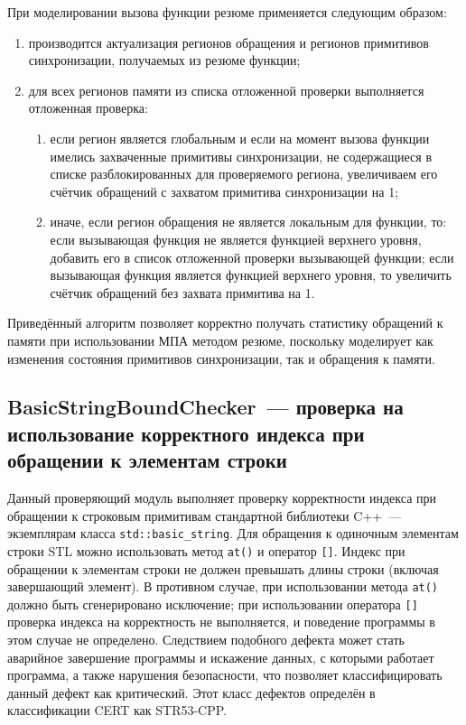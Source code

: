 При моделировании вызова функции резюме применяется следующим образом:

\begin{enumerate}
 \item производится актуализация регионов обращения и регионов примитивов синхронизации, получаемых из резюме функции;
 \item для всех регионов памяти из списка отложенной проверки выполняется отложенная проверка:
 \begin{enumerate}
 \item если регион является глобальным и если на момент вызова функции имелись захваченные примитивы синхронизации, не содержащиеся в списке разблокированных для проверяемого региона, увеличиваем его счётчик обращений с захватом примитива синхронизации на 1;
 \item иначе, если регион обращения не является локальным для функции, то: если вызывающая функция не является функцией верхнего уровня, добавить его в список отложенной проверки вызывающей функции; если вызывающая функция является функцией верхнего уровня, то увеличить счётчик обращений без захвата примитива на 1.
 \end{enumerate}
\end{enumerate}

Приведённый алгоритм позволяет корректно получать статистику обращений к памяти при использовании МПА методом резюме, поскольку моделирует как изменения состояния примитивов синхронизации, так и обращения к памяти.


\subsection{BasicStringBoundChecker~--- проверка на использование корректного индекса при обращении к элементам строки} \label{sect:basic_string}

Данный проверяющий модуль выполняет проверку корректности индекса при обращении к строковым примитивам стандартной библиотеки C++~--- экземплярам класса \texttt{std::basic\_string}. Для обращения к одиночным элементам строки STL можно использовать метод \texttt{at()} и оператор \texttt{[]}. Индекс при обращении к элементам строки не должен превышать длины строки (включая завершающий элемент). В противном случае, при использовании метода \texttt{at()} должно быть сгенерировано исключение; при использовании оператора \texttt{[]} проверка индекса на корректность не выполняется, и поведение программы в этом случае не определено. Следствием подобного дефекта может стать аварийное завершение программы и искажение данных, с которыми работает программа, а также нарушения безопасности, что позволяет классифицировать данный дефект как критический. Этот класс дефектов определён в классификации CERT как STR53-CPP.

